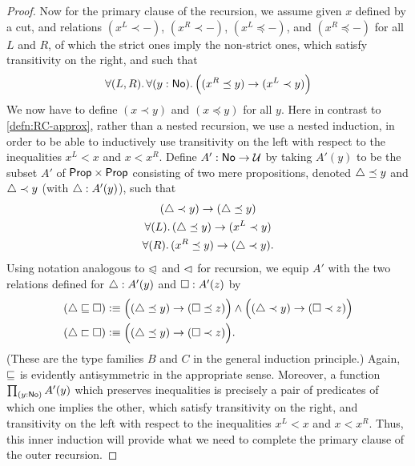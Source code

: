 \begin{proof}
  Now for the primary clause of the recursion, we assume given $x$ defined by a cut, and relations $(x^L \prec -)$, $(x^R \prec -)$, $(x^L \preceq -)$, and $(x^R \preceq -)$ for all $L$ and $R$, of which the strict ones imply the non-strict ones, which satisfy transitivity on the right, and such that
  \begin{equation}\label{eq:NO-prec-outer-IH}
    \fall{L,R}{y:\NO}\Big( (x^R\preceq y) \to (x^L \prec y) \Big)
  \end{equation}
  We now have to define $(x\prec y)$ and $(x\preceq y)$ for all $y$.
  Here in contrast to \autoref{defn:RC-approx}, rather than a nested recursion, we use a nested induction, in order to be able to inductively use transitivity on the left with respect to the inequalities $x^L<x$ and $x<x^R$.
  Define $A':\mathsf{No}\to\mathcal{U}$ by taking $A'(y)$ to be the subset $A'$ of $\mathsf{Prop}\times\mathsf{Prop}$ consisting of two mere propositions, denoted $\triangle\preceq y$ and $\triangle\prec y$ (with $\triangle:A'(y)$), such that
  \begin{gather}
    (\tlt y) \to (\tle y)\\
    \fall{L} (\tle y)\to (x^L\prec y) \label{eq:NO-prec-IHL}\\
    \fall{R} (x^R \preceq y) \to (\tlt y) \label{eq:NO-prec-IHR}.
  \end{gather}
  Using notation analogous to $\trianglelefteqslant$ and $\vartriangleleft$ for recursion, we equip $A'$ with the two relations defined for $\triangle:A'(y)$ and $\square:A'(z)$ by
  \begin{align*}
    (\tlname \bble \tlbname) &\defeq
    \Big((\tle y) \to (\tleb z)\Big) \land \Big((\tlt y) \to (\tltb z)\Big)\\
    (\tlname \bblt \tlbname) &\defeq
    \Big((\tle y) \to (\tltb z)\Big). %
  \end{align*}
  (These are the type families $B$ and $C$ in the general induction principle.)
  Again, $\sqsubseteq$ is evidently antisymmetric in the appropriate sense.
  Moreover, a function $\prd{y:\NO} A'(y)$ which preserves inequalities is precisely a pair of predicates of which one implies the other, which satisfy transitivity on the right, and transitivity on the left with respect to the inequalities $x^L<x$ and $x<x^R$.
  Thus, this inner induction will provide what we need to complete the primary clause of the outer recursion.


\end{proof}
